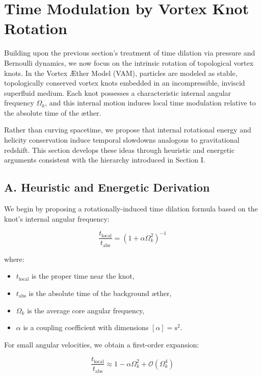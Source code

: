 \section{Time Modulation by Vortex Knot Rotation}

Building upon the previous section's treatment of time dilation via pressure and Bernoulli dynamics, we now focus on the intrinsic rotation of topological vortex knots. In the Vortex Æther Model (VAM), particles are modeled as stable, topologically conserved vortex knots embedded in an incompressible, inviscid superfluid medium. Each knot possesses a characteristic internal angular frequency $\Omega_k$, and this internal motion induces local time modulation relative to the absolute time of the æther.

Rather than curving spacetime, we propose that internal rotational energy and helicity conservation induce temporal slowdowns analogous to gravitational redshift. This section develops these ideas through heuristic and energetic arguments consistent with the hierarchy introduced in Section I.

\subsection*{A. Heuristic and Energetic Derivation}

We begin by proposing a rotationally-induced time dilation formula based on the knot's internal angular frequency:

\begin{equation}
\frac{t_{\text{local}}}{t_{\text{abs}}} = \left(1 + \alpha \Omega_k^2 \right)^{-1}
\end{equation}

where:

\begin{itemize}
\item $t_{\text{local}}$ is the proper time near the knot,
\item $t_{\text{abs}}$ is the absolute time of the background æther,
\item $\Omega_k$ is the average core angular frequency,
\item $\alpha$ is a coupling coefficient with dimensions $[\alpha] = \text{s}^2$.
\end{itemize}

For small angular velocities, we obtain a first-order expansion:

\begin{equation}
\frac{t_{\text{local}}}{t_{\text{abs}}} \approx 1 - \alpha \Omega_k^2 + \mathcal{O}(\Omega_k^4)
\end{equation}

